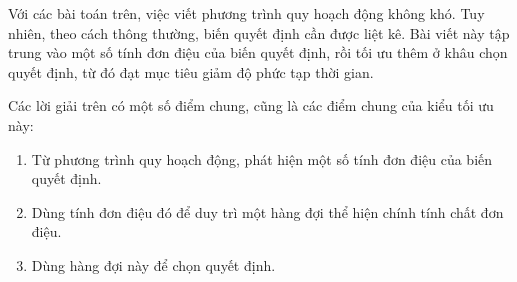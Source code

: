 \documentclass[11pt]{article}
\begin{document}
Với các bài toán trên, việc viết phương trình quy hoạch động không khó. Tuy
nhiên, theo cách thông thường, biến quyết định cần được liệt kê. Bài viết này
tập trung vào một số tính đơn điệu của biến quyết định, rồi tối ưu thêm ở
khâu chọn quyết định, từ đó đạt mục tiêu giảm độ phức tạp thời gian.

Các lời giải trên có một số điểm chung, cũng là các điểm chung của kiểu tối
ưu này:
\begin{enumerate}
  \item Từ phương trình quy hoạch động, phát hiện một số tính đơn điệu của
  biến quyết định.
  \item Dùng tính đơn điệu đó để duy trì một hàng đợi thể hiện chính tính
  chất đơn điệu.
  \item Dùng hàng đợi này để chọn quyết định.
\end{enumerate}
\end{document}
